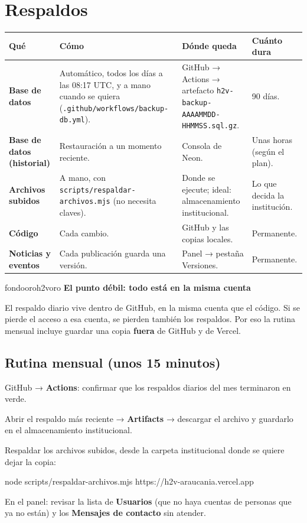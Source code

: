 \documentclass[11pt,letterpaper]{article}
\newcommand{\var}[1]{\nolinkurl{#1}}
\newcommand{\ruta}[1]{\nolinkurl{#1}}
\newcommand{\titulorecuadro}[2]{{\bfseries\color{#1}#2}\par\vspace{2pt}}
\newcommand{\cab}[1]{\textbf{\color{h2vgris}#1}}
\newcommand{\fila}[1]{\textbf{\color{h2vazul}#1}}
\begin{document}
\section{Respaldos}

\begin{tabularx}{\textwidth}{@{}P{2.7cm}YP{3.3cm}P{2.3cm}@{}}
\toprule
\cab{Qué} & \cab{Cómo} & \cab{Dónde queda} & \cab{Cuánto dura}\\
\midrule
\fila{Base de datos} & Automático, todos los días a las 08:17 UTC, y a mano cuando se quiera (\ruta{.github/workflows/backup-db.yml}). & GitHub → Actions → artefacto \var{h2v-backup-AAAAMMDD-HHMMSS.sql.gz}. & 90 días.\\
\fila{Base de datos (historial)} & Restauración a un momento reciente. & Consola de Neon. & Unas horas (según el plan).\\
\fila{Archivos subidos} & A mano, con \ruta{scripts/respaldar-archivos.mjs} (no necesita claves). & Donde se ejecute; ideal: almacenamiento institucional. & Lo que decida la institución.\\
\fila{Código} & Cada cambio. & GitHub y las copias locales. & Permanente.\\
\fila{Noticias y eventos} & Cada publicación guarda una versión. & Panel → pestaña Versiones. & Permanente.\\
\bottomrule
\end{tabularx}

\begin{recuadro}{fondooro}{h2voro}
\titulorecuadro{h2vazul}{El punto débil: todo está en la misma cuenta}
El respaldo diario vive dentro de GitHub, en la misma cuenta que el código. Si se pierde el acceso a esa cuenta, se pierden también los respaldos. Por eso la rutina mensual incluye guardar una copia \textbf{fuera} de GitHub y de Vercel.
\end{recuadro}

\subsection{Rutina mensual (unos 15 minutos)}
\begin{pasos}
\item GitHub → \textbf{Actions}: confirmar que los respaldos diarios del mes terminaron en verde.
\item Abrir el respaldo más reciente → \textbf{Artifacts} → descargar el archivo y guardarlo en el almacenamiento institucional.
\item Respaldar los archivos subidos, desde la carpeta institucional donde se quiere dejar la copia:
\end{pasos}
\begin{codigo}
node scripts/respaldar-archivos.mjs https://h2v-araucania.vercel.app
\end{codigo}
\begin{pasos}[resume]
\item En el panel: revisar la lista de \textbf{Usuarios} (que no haya cuentas de personas que ya no están) y los \textbf{Mensajes de contacto} sin atender.
\end{pasos}
\end{document}
